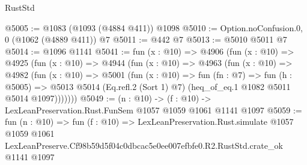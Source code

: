 \begin{lexlean}{RustStd}
\begin{coremodule}
@5005 := @1083 (@1093 (@4884 @411)) @1098
@5010 := Option.noConfusion.{0, 0} (@1062 (@4889 @411)) @7
@5011 := @442 @7
@5013 := @5010 @5011 @7
@5014 := @1096 @1141
@5041 := fun (x : @10) =>
  @4906
    (fun (x : @10) =>
    @4925
      (fun (x : @10) =>
      @4944
        (fun (x : @10) =>
        @4963
          (fun (x : @10) =>
          @4982
            (fun (x : @10) =>
            @5001
              (fun (x : @10) =>
              fun (fn : @7) =>
              fun (h : @5005) =>
              @5013 @5014 (Eq.refl.{2} (Sort 1) @7) (heq_of_eq.{1} @1082 @5011 @5014 @1097)))))))
@5049 := (n : @10) -> (f : @10) -> LexLeanPreservation.Rust.FunSem @1057 @1059 @1061 @1141 @1097
@5059 := fun (n : @10) =>
  fun (f : @10) =>
  LexLeanPreservation.Rust.simulate
    @1057
    @1059
    @1061
    LexLeanPreserve.Cf98b59d5f04c0dbcac5e0ee007efbfe0.R2.RustStd.crate_ok
    @1141
    @1097
\end{coremodule}
\end{lexlean}
